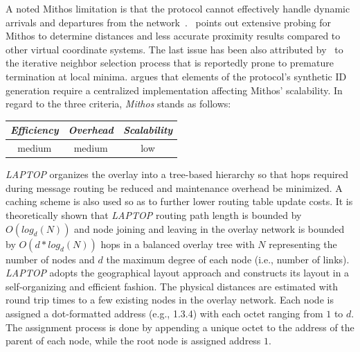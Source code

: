 A noted Mithos limitation is that the protocol cannot effectively
handle dynamic arrivals and departures from the network~\cite{RGJZ2004}. 
\cite{CCRK2004}~points out extensive probing for Mithos to determine 
distances and less accurate proximity results compared to other
virtual coordinate systems. The last issue  has been also attributed
by~\cite{WSS2005} to the iterative neighbor selection process that is 
reportedly prone to premature termination at local minima.
\cite{cox_vivaldi_2004} argues that elements of the protocol's
synthetic ID generation require a centralized implementation 
affecting Mithos' scalability.
In regard to the three criteria, \emph{Mithos} stands as follows:
\begin{center}
{\footnotesize
\begin{tabular}{ccc}
\emph{Efficiency} & \emph{Overhead} & \emph{Scalability} \\
\hline
medium &
medium &
low
\end{tabular}
}
\end{center}

%
\emph{LAPTOP} \cite{WLH2007} organizes the overlay 
into a tree-based hierarchy so that 
hops required during message routing be reduced and 
maintenance overhead be minimized.
A caching scheme is also used so as
to further lower routing table update costs. 
It is theoretically shown that 
\emph{LAPTOP} routing path length is bounded by $O(log_d(N))$ and node
joining and leaving in the overlay network is bounded by
$O(d*log_d(N))$ hops in a balanced overlay tree with $N$ representing the
number of nodes and $d$ the maximum degree of each node (i.e., number of links). 
\emph{LAPTOP} adopts the geographical layout approach  
and constructs its layout in a self-organizing and 
efficient fashion. 
The physical distances are estimated
with round trip times to a few existing nodes in the overlay network.
Each node is assigned a dot-formatted address (e.g., 1.3.4) with
each octet ranging from $1$ to $d$.
The assignment process is done by appending a unique octet 
to the address of the parent of each node, while
the root node is assigned address $1$.

